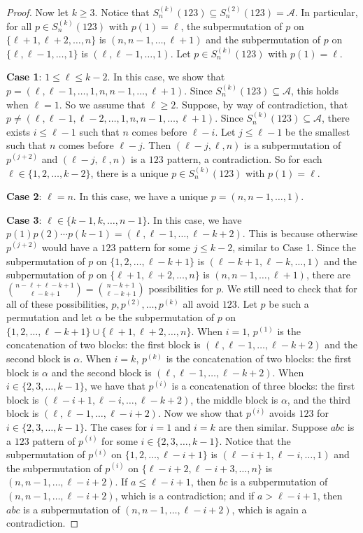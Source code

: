 \documentclass[11pt]{article}
\theoremstyle{definition}
\numberwithin{equation}{section}
\begin{document}
\begin{proof}
Now let $k\geq3$. Notice that $S_n^{(k)}(123)\subseteq S_n^{(2)}(123)=\mathcal{A}$. In particular, for all $p\in S_n^{(k)}(123)$ with $p(1)=\ell$, the subpermutation of $p$ on $\{\ell+1,\ell+2,\ldots,n\}$ is $(n,n-1,\ldots,\ell+1)$ and the subpermutation of $p$ on $\{\ell,\ell-1,\ldots,1\}$ is $(\ell,\ell-1,\ldots,1)$. Let $p\in S_n^{(k)}(123)$ with $p(1)=\ell$.

\textbf{Case 1}: $1\leq \ell\leq k-2$.
In this case, we show that $p=(\ell,\ell-1,\ldots,1,n,n-1,\ldots,\ell+1)$. 
Since $S_n^{(k)}(123)\subseteq\mathcal{A}$, this holds when $\ell=1$. So we assume that $\ell\geq2$. Suppose, by way of contradiction, that $p\neq (\ell,\ell-1,\ell-2,\ldots,1,n,n-1,\ldots,\ell+1)$. Since $S_n^{(k)}(123)\subseteq\mathcal{A}$, there exists $i\leq \ell-1$ such that $n$ comes before $\ell-i$. Let $j\leq \ell-1$ be the smallest such that $n$ comes before $\ell-j$. Then $(\ell-j,\ell,n)$ is a subpermutation of $p^{(j+2)}$ 
and $(\ell-j,\ell,n)$ is a $123$ pattern, a contradiction. So for each $\ell\in\{1,2,\ldots,k-2\}$, there is a unique $p\in S_n^{(k)}(123)$ with $p(1)=\ell$.

\textbf{Case 2}: $\ell=n$. In this case, we have a unique $p=(n,n-1,\ldots,1)$.

\textbf{Case 3}: $\ell\in\{k-1,k,\ldots,n-1\}$. 
In this case, we have $p(1)p(2)\cdots p(k-1)=(\ell,\ell-1,\ldots,\ell-k+2)$. 
This is because otherwise 
$p^{(j+2)}$ would have a $123$ pattern for some $j\leq k-2$, similar to Case 1.
Since the subpermutation of $p$ on $\{1,2,\ldots,\ell-k+1\}$ is $(\ell-k+1,\ell-k,\ldots,1)$ and the subpermutation of $p$ on $\{\ell+1,\ell+2,\ldots,n\}$ is $(n,n-1,\ldots,\ell+1)$, there are $\binom{n-\ell+\ell-k+1}{\ell-k+1}=\binom{n-k+1}{\ell-k+1}$ possibilities for $p$. 
We still need to check that for all of these possibilities, $p,p^{(2)},\ldots,p^{(k)}$ all avoid $123$. Let $p$ be such a permutation and let $\alpha$ be the subpermutation of $p$ on $\{1,2,\ldots,\ell-k+1\}\cup\{\ell+1,\ell+2,\ldots,n\}$. When $i=1$, 
$p^{(1)}$ is the concatenation of two blocks: the first block is $(\ell,\ell-1,\ldots,\ell-k+2)$ and the second block is $\alpha$. 
When $i=k$, 
$p^{(k)}$ is the concatenation of two blocks: the first block is $\alpha$ and the second block is $(\ell,\ell-1,\ldots,\ell-k+2)$. When $i\in\{2,3,\ldots,k-1\}$, we have that $p^{(i)}$ is a concatenation of three blocks: the first block is $(\ell-i+1,\ell-i,\ldots,\ell-k+2)$, the middle block is $\alpha$, and the third block is $(\ell,\ell-1,\ldots,\ell-i+2)$. 
Now we show that $p^{(i)}$ avoids $123$ for $i\in\{2,3,\ldots,k-1\}$. The cases for $i=1$ and $i=k$ are then similar. Suppose $abc$ is a $123$ pattern of $p^{(i)}$ for some $i\in\{2,3,\ldots,k-1\}$. Notice that the subpermutation of $p^{(i)}$ on $\{1,2,\ldots,\ell-i+1\}$ is $(\ell-i+1,\ell-i,\ldots,1)$ and the subpermutation of $p^{(i)}$ on $\{\ell-i+2,\ell-i+3,\ldots,n\}$ is $(n,n-1,\ldots,\ell-i+2)$. If $a\leq \ell-i+1$, then $bc$ is a subpermutation of $(n,n-1,\ldots,\ell-i+2)$, which is a contradiction; and if $a>\ell-i+1$, then $abc$ is a subpermutation of $(n,n-1,\ldots,\ell-i+2)$, which is again a contradiction.


\end{proof}
\end{document}

